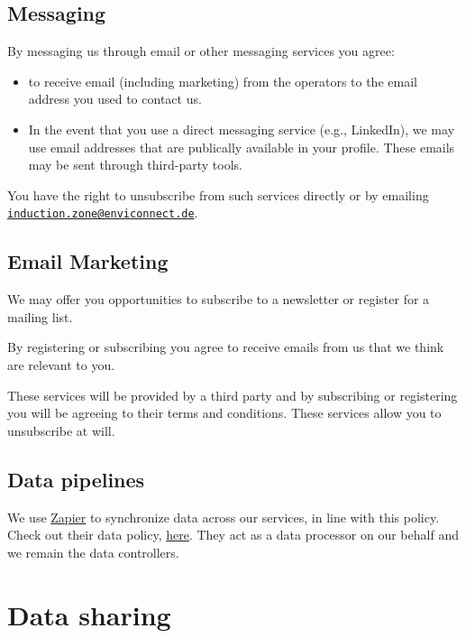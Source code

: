 \documentclass[
  10pt,
  a4paper,
]{article}
\providecommand{\tightlist}{%
  \setlength{\itemsep}{0pt}\setlength{\parskip}{0pt}}
\begin{document}
\hypertarget{messaging}{%
\subsection{Messaging}\label{messaging}}

By messaging us through email or other messaging services you agree:

\begin{itemize}
\tightlist
\item
  to receive email (including marketing) from the operators to the email
  address you used to contact us.
\item
  In the event that you use a direct messaging service (e.g., LinkedIn),
  we may use email addresses that are publically available in your
  profile. These emails may be sent through third-party tools.
\end{itemize}

You have the right to unsubscribe from such services directly or by
emailing
\href{mailto:induction.zone@enviconnect.de}{\nolinkurl{induction.zone@enviconnect.de}}.

\hypertarget{email-marketing}{%
\subsection{Email Marketing}\label{email-marketing}}

We may offer you opportunities to subscribe to a newsletter or register
for a mailing list.

By registering or subscribing you agree to receive emails from us that
we think are relevant to you.

These services will be provided by a third party and by subscribing or
registering you will be agreeing to their terms and conditions. These
services allow you to unsubscribe at will.

\hypertarget{data-pipelines}{%
\subsection{Data pipelines}\label{data-pipelines}}

We use \href{https://www.zapier.com}{Zapier} to synchronize data across
our services, in line with this policy. Check out their data policy,
\href{https://zapier.com/help/account/data-management/data-privacy-at-zapier}{here}.
They act as a data processor on our behalf and we remain the data
controllers.

\hypertarget{data-sharing}{%
\section{Data sharing}\label{data-sharing}}
\end{document}
